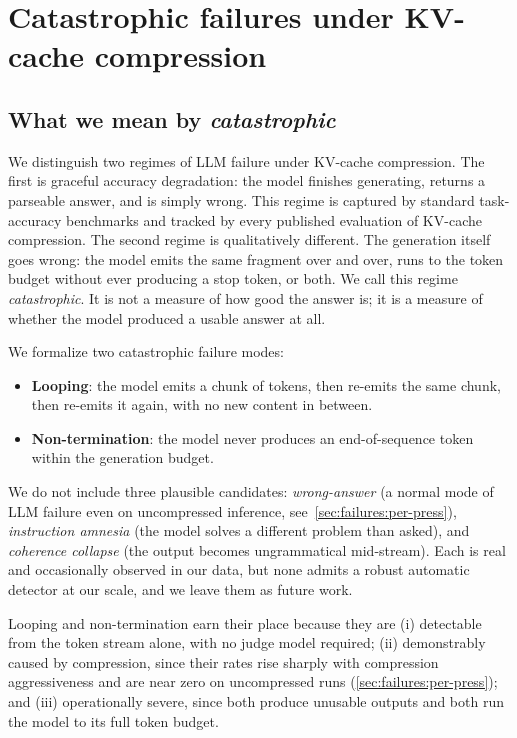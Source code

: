 \documentclass[11pt,a4paper]{article}
\begin{document}
\section{Catastrophic failures under KV-cache compression}
\label{sec:failures}

\subsection{What we mean by \emph{catastrophic}}
\label{sec:failures:definition}

We distinguish two regimes of LLM failure under KV-cache compression. The first is graceful accuracy degradation: the model finishes generating, returns a parseable answer, and is simply wrong. This regime is captured by standard task-accuracy benchmarks and tracked by every published evaluation of KV-cache compression. The second regime is qualitatively different. The generation itself goes wrong: the model emits the same fragment over and over, runs to the token budget without ever producing a stop token, or both. We call this regime \emph{catastrophic}. It is not a measure of how good the answer is; it is a measure of whether the model produced a usable answer at all.

We formalize two catastrophic failure modes:
\begin{itemize}[leftmargin=*,itemsep=2pt,topsep=2pt]
  \item \textbf{Looping}: the model emits a chunk of tokens, then re-emits the same chunk, then re-emits it again, with no new content in between.
  \item \textbf{Non-termination}: the model never produces an end-of-sequence token within the generation budget.
\end{itemize}

We do not include three plausible candidates: \emph{wrong-answer} (a normal mode of LLM failure even on uncompressed inference, see~\cref{sec:failures:per-press}), \emph{instruction amnesia} (the model solves a different problem than asked), and \emph{coherence collapse} (the output becomes ungrammatical mid-stream). Each is real and occasionally observed in our data, but none admits a robust automatic detector at our scale, and we leave them as future work.

Looping and non-termination earn their place because they are (i) detectable from the token stream alone, with no judge model required; (ii) demonstrably caused by compression, since their rates rise sharply with compression aggressiveness and are near zero on uncompressed runs (\cref{sec:failures:per-press}); and (iii) operationally severe, since both produce unusable outputs and both run the model to its full token budget.
\end{document}
